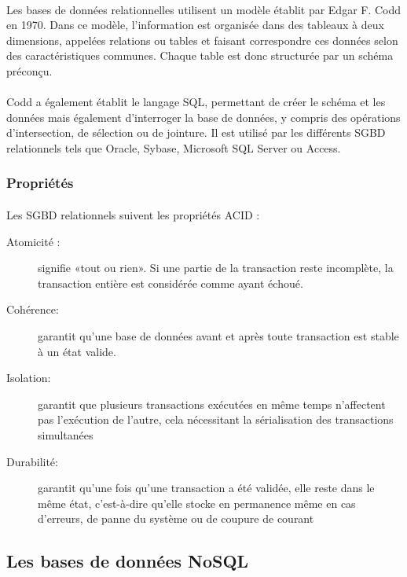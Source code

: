 \paragraph{}Les bases de données relationnelles utilisent un modèle établit par Edgar F. Codd en 1970. Dans ce modèle, l’information est organisée dans des tableaux à deux dimensions, appelées relations ou tables et faisant correspondre ces données selon des caractéristiques communes. Chaque table est donc structurée par un schéma préconçu.

\paragraph{}Codd a également établit le langage \acrshort{SQL}, permettant de créer le schéma et les données mais également d’interroger la base de données, y compris des opérations d’intersection, de sélection ou de jointure. Il est utilisé par les différents \acrlong{SGBD} relationnels tels que Oracle, Sybase, Microsoft SQL Server ou Access.

\subsubsection{Propriétés}
\paragraph{}Les SGBD relationnels suivent les propriétés ACID :
\begin{description}
    \item[Atomicité :] signifie «tout ou rien». Si une partie de la transaction reste incomplète, la transaction entière est considérée comme ayant échoué.
    \item[Cohérence:] garantit qu'une base de données avant et après toute transaction est stable à un état valide.
    \item[Isolation:] garantit que plusieurs transactions exécutées en même temps n'affectent pas l'exécution de l'autre, cela nécessitant la sérialisation des transactions simultanées
    \item[Durabilité:] garantit qu'une fois qu'une transaction a été validée, elle reste dans le même état, c'est-à-dire qu'elle stocke en permanence même en cas d'erreurs, de panne du système ou de coupure de courant
\end{description}

\subsection{Les bases de données NoSQL}

